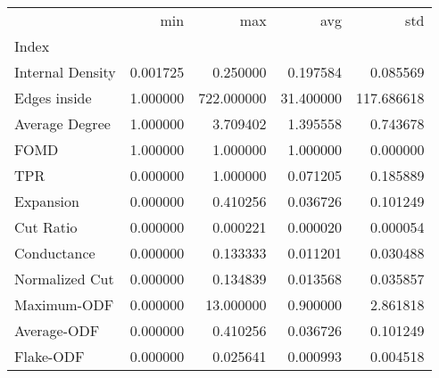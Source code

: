 \begin{tabular}{lrrrr}
\toprule
{} &       min &         max &        avg &         std \\
Index            &           &             &            &             \\
\midrule
Internal Density &  0.001725 &    0.250000 &   0.197584 &    0.085569 \\
Edges inside     &  1.000000 &  722.000000 &  31.400000 &  117.686618 \\
Average Degree   &  1.000000 &    3.709402 &   1.395558 &    0.743678 \\
FOMD             &  1.000000 &    1.000000 &   1.000000 &    0.000000 \\
TPR              &  0.000000 &    1.000000 &   0.071205 &    0.185889 \\
Expansion        &  0.000000 &    0.410256 &   0.036726 &    0.101249 \\
Cut Ratio        &  0.000000 &    0.000221 &   0.000020 &    0.000054 \\
Conductance      &  0.000000 &    0.133333 &   0.011201 &    0.030488 \\
Normalized Cut   &  0.000000 &    0.134839 &   0.013568 &    0.035857 \\
Maximum-ODF      &  0.000000 &   13.000000 &   0.900000 &    2.861818 \\
Average-ODF      &  0.000000 &    0.410256 &   0.036726 &    0.101249 \\
Flake-ODF        &  0.000000 &    0.025641 &   0.000993 &    0.004518 \\
\bottomrule
\end{tabular}
